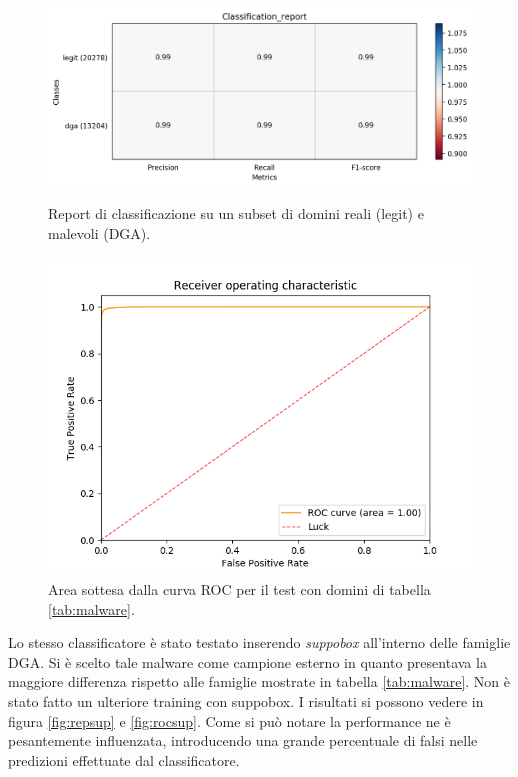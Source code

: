\begin{figure}[!htbp]
    \centering
    \includegraphics[width=\columnwidth]{figures/rndf_tra_nosup_nosup/class_rep.png}
    \caption{Report di classificazione su un subset di domini reali (legit) e malevoli (DGA).\label{fig:repdga}}

    \centering
    \includegraphics[width=\columnwidth]{figures/rndf_tra_nosup_nosup/roc_plot.png}
    \caption{Area sottesa dalla curva ROC per il test con domini di tabella \ref{tab:malware}.\label{fig:rocdga}}
\end{figure}

Lo stesso classificatore è stato testato inserendo \textit{suppobox} all'interno delle famiglie DGA. Si è scelto tale malware come campione esterno in quanto presentava la maggiore differenza rispetto alle famiglie mostrate in tabella \ref{tab:malware}. Non è stato fatto un ulteriore training con suppobox. I risultati si possono vedere in figura \ref{fig:repsup} e \ref{fig:rocsup}. Come si può notare la performance ne è pesantemente influenzata, introducendo una grande percentuale di falsi nelle predizioni effettuate dal classificatore.

